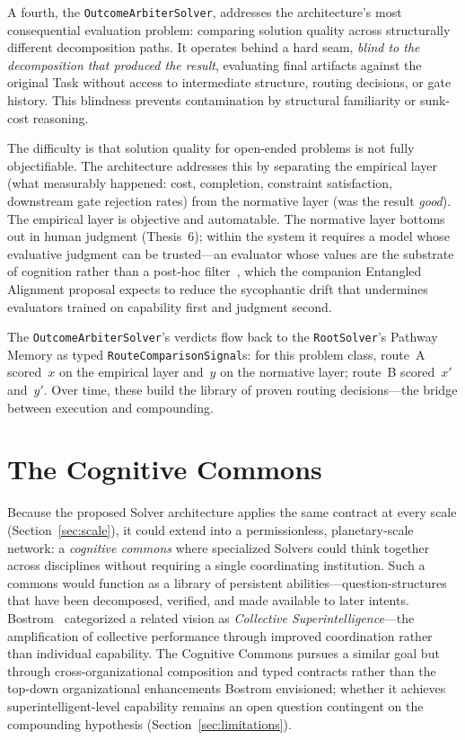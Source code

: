 \documentclass[11pt]{article}
\let\oldtexttt\texttt
\renewcommand{\texttt}[1]{\oldtexttt{\small #1}}
\begin{document}
A fourth, the \texttt{OutcomeArbiterSolver}, addresses the architecture's most consequential evaluation problem: comparing solution quality across structurally different decomposition paths. It operates behind a hard seam, \emph{blind to the decomposition that produced the result}, evaluating final artifacts against the original Task without access to intermediate structure, routing decisions, or gate history. This blindness prevents contamination by structural familiarity or sunk-cost reasoning.

The difficulty is that solution quality for open-ended problems is not fully objectifiable. The architecture addresses this by separating the empirical layer (what measurably happened: cost, completion, constraint satisfaction, downstream gate rejection rates) from the normative layer (was the result \emph{good}). The empirical layer is objective and automatable. The normative layer bottoms out in human judgment (Thesis~6); within the system it requires a model whose evaluative judgment can be trusted---an evaluator whose values are the substrate of cognition rather than a post-hoc filter~\cite{westerberg2026entangled}, which the companion Entangled Alignment proposal expects to reduce the sycophantic drift that undermines evaluators trained on capability first and judgment second.

The \texttt{OutcomeArbiterSolver}'s verdicts flow back to the \texttt{RootSolver}'s Pathway Memory as typed \texttt{RouteComparisonSignal}s: for this problem class, route~A scored~$x$ on the empirical layer and~$y$ on the normative layer; route~B scored~$x'$ and~$y'$. Over time, these build the library of proven routing decisions---the bridge between execution and compounding.

\section{The Cognitive Commons}
\label{sec:global}

Because the proposed Solver architecture applies the same contract at every scale (Section~\ref{sec:scale}), it could extend into a permissionless, planetary-scale network: a \emph{cognitive commons} where specialized Solvers could think together across disciplines without requiring a single coordinating institution. Such a commons would function as a library of persistent abilities---question-structures that have been decomposed, verified, and made available to later intents. Bostrom~\cite{bostrom2014} categorized a related vision as \emph{Collective Superintelligence}---the amplification of collective performance through improved coordination rather than individual capability. The Cognitive Commons pursues a similar goal but through cross-organizational composition and typed contracts rather than the top-down organizational enhancements Bostrom envisioned; whether it achieves superintelligent-level capability remains an open question contingent on the compounding hypothesis (Section~\ref{sec:limitations}).
\end{document}

